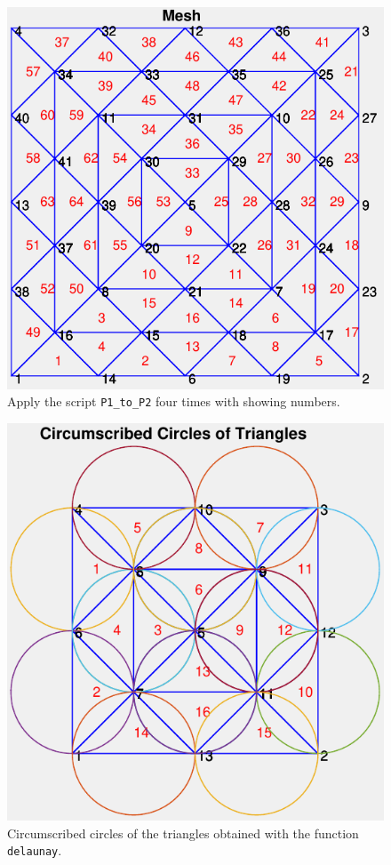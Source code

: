 \documentclass[11pt,a4paper,center,notitlepage]{article}
\numberwithin{equation}{section}
\begin{document}
\begin{figure}[H]
\centering
\includegraphics[scale=0.6]{7}
\caption{Apply the script \texttt{P1\_to\_P2} four times with showing numbers.}
\label{fig7}
\end{figure}

\begin{figure}[H]
\centering
\includegraphics[scale=0.6]{10}
\caption{Circumscribed circles of the triangles obtained with the function \texttt{delaunay}.}
\label{fig10}
\end{figure}
\end{document}
